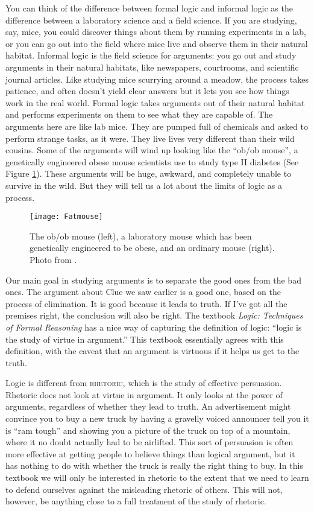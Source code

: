 You can think of the difference between formal logic and informal logic as the difference between a laboratory science and a field science. \label{lab_vs._field_science} If you are studying, say, mice, you could discover things about them by running experiments in a lab, or you can go out into the field where mice live and observe them in their natural habitat.  Informal logic is the field science for arguments: you go out and study arguments in their natural habitats, like newspapers, courtrooms, and scientific journal articles. Like studying mice scurrying around a meadow, the process takes patience, and often doesn't yield clear answers but it lets you see how things work in the real world. Formal logic takes arguments out of their natural habitat and performs experiments on them to see what they are capable of. The arguments here are like lab mice. They are pumped full of chemicals and asked to perform strange tasks, as it were. They live lives very different than their wild cousins. Some of the arguments will wind up looking like the ``ob/ob mouse'', a genetically engineered obese mouse scientists use to study type II diabetes (See Figure \ref{fig:ob_ob_mouse}). These arguments will be huge, awkward, and completely unable to survive in the wild. But they will tell us a lot about the limits of logic as a process.

\begin{figure}
\texttt{[image: Fatmouse]}
\label{fig:ob_ob_mouse}
\caption{The ob/ob mouse (left), a laboratory mouse which has been genetically engineered to be obese, and an ordinary mouse (right). Photo from \parencite{commons2006}.}
\end{figure}

Our main goal in studying arguments is to separate the good ones from the bad ones. The argument about Clue we saw earlier is a good one, based on the process of elimination.  It is good because it leads to truth. If I've got all the premises right, the conclusion will also be right. The textbook \textit{Logic: Techniques of Formal Reasoning}\cite{Kalish1980} has a nice way of capturing the definition of logic: ``logic is the study of virtue in argument.'' \label{virtue_in_argument} This textbook essentially agrees with this definition, with the caveat that an argument is virtuous if it helps us get to the truth.

Logic is different from \textsc{\gls{rhetoric}}, which is the study of effective persuasion. Rhetoric does not look at virtue in argument. It only looks at the power of arguments, regardless of whether they lead to truth. An advertisement might convince you to buy a new truck by having a gravelly voiced announcer tell you it is ``ram tough'' and showing you a picture of the truck on top of a mountain, where it no doubt actually had to be airlifted. This sort of persuasion is often more effective at getting people to believe things than logical argument, but it has nothing to do with whether the truck is really the right thing to buy. In this textbook we will only be interested in rhetoric to the extent that we need to learn to defend ourselves against the misleading rhetoric of others. This will not, however, be anything close to a full treatment of the study of rhetoric.


